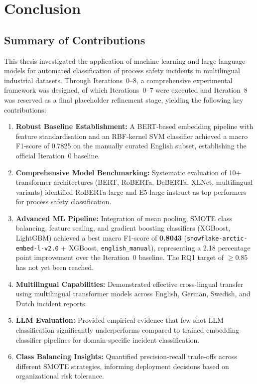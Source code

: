 \documentclass[11pt, titlepage, bibliography=totoc]{scrreprt}
\begin{document}
\chapter{Conclusion}

\section{Summary of Contributions}

This thesis investigated the application of machine learning and large language models for automated classification of process safety incidents in multilingual industrial datasets. Through Iterations~0--8, a comprehensive experimental framework was designed, of which Iterations~0--7 were executed and Iteration~8 was reserved as a final placeholder refinement stage, yielding the following key contributions:

\begin{enumerate}
    \item \textbf{Robust Baseline Establishment:} A BERT-based embedding pipeline with feature standardisation and an RBF-kernel SVM classifier achieved a macro F1-score of 0.7825 on the manually curated English subset, establishing the official Iteration~0 baseline.
    
    \item \textbf{Comprehensive Model Benchmarking:} Systematic evaluation of 10+ transformer architectures (BERT, RoBERTa, DeBERTa, XLNet, multilingual variants) identified RoBERTa-large and E5-large-instruct as top performers for process safety classification.
    
    \item \textbf{Advanced ML Pipeline:} Integration of mean pooling, SMOTE class balancing, feature scaling, and gradient boosting classifiers (XGBoost, LightGBM) achieved a best macro F1-score of \textbf{0.8043} (\texttt{snowflake-arctic-embed-l-v2.0} + XGBoost, \texttt{english\_manual}), representing a 2.18 percentage point improvement over the Iteration~0 baseline. The RQ1 target of $\geq 0.85$ has not yet been reached.
    
    \item \textbf{Multilingual Capabilities:} Demonstrated effective cross-lingual transfer using multilingual transformer models across English, German, Swedish, and Dutch incident reports.
    
    \item \textbf{LLM Evaluation:} Provided empirical evidence that few-shot LLM classification significantly underperforms compared to trained embedding-classifier pipelines for domain-specific incident classification.
    
    \item \textbf{Class Balancing Insights:} Quantified precision-recall trade-offs across different SMOTE strategies, informing deployment decisions based on organizational risk tolerance.
\end{enumerate}
\end{document}
